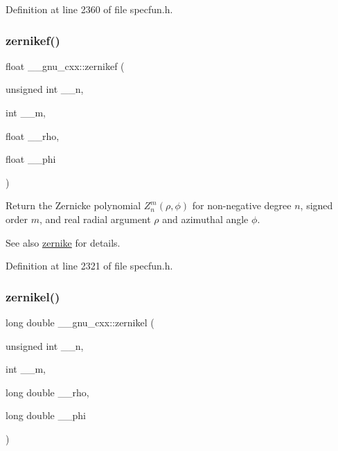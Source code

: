Definition at line 2360 of file specfun.\+h.

\mbox{\label{group__gnu__math__spec__func_gababce1066ecef7258070b9b7fcea975f}} 
\subsubsection{\texorpdfstring{zernikef()}{zernikef()}}
{\footnotesize\ttfamily float \+\_\+\+\_\+gnu\+\_\+cxx\+::zernikef (\begin{DoxyParamCaption}\item[{unsigned int}]{\+\_\+\+\_\+n,  }\item[{int}]{\+\_\+\+\_\+m,  }\item[{float}]{\+\_\+\+\_\+rho,  }\item[{float}]{\+\_\+\+\_\+phi }\end{DoxyParamCaption})\hspace{0.3cm}{\ttfamily [inline]}}

Return the Zernicke polynomial $ Z_n^m(\rho,\phi) $ for non-\/negative degree $ n $, signed order $ m $, and real radial argument $ \rho $ and azimuthal angle $ \phi $.

\begin{DoxySeeAlso}{See also}
\hyperlink{group__gnu__math__spec__func_gaaed33f29c1eb1d2c5b9590fe2e57151c}{zernike} for details. 
\end{DoxySeeAlso}


Definition at line 2321 of file specfun.\+h.

\mbox{\label{group__gnu__math__spec__func_ga9236dd8545b448da9cb05dd8b7cf6811}} 
\subsubsection{\texorpdfstring{zernikel()}{zernikel()}}
{\footnotesize\ttfamily long double \+\_\+\+\_\+gnu\+\_\+cxx\+::zernikel (\begin{DoxyParamCaption}\item[{unsigned int}]{\+\_\+\+\_\+n,  }\item[{int}]{\+\_\+\+\_\+m,  }\item[{long double}]{\+\_\+\+\_\+rho,  }\item[{long double}]{\+\_\+\+\_\+phi }\end{DoxyParamCaption})\hspace{0.3cm}{\ttfamily [inline]}}

